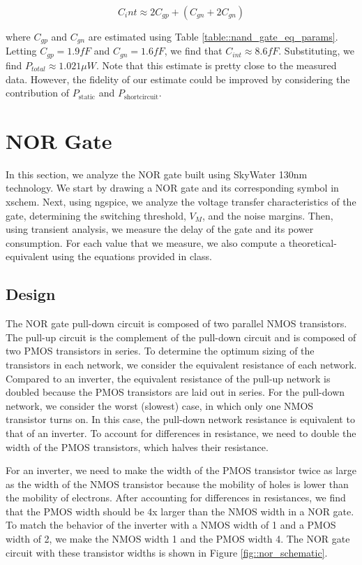 \documentclass{article}
\begin{document}
	 \begin{equation}
	 	\label{eq::nand_cint_est}
	 	C_int \approx 2C_{gp} + (C_{gn} + 2C_{gn})
	 \end{equation}
	 
	  \noindent where $C_{gp}$ and $C_{gn}$ are estimated using Table \ref{table::nand_gate_eq_params}. Letting $C_{gp} = 1.9 fF$ and $C_{gn} = 1.6 fF$, we find that $C_{int} \approx 8.6 fF$. Substituting, we find $P_{total} \approx 1.021 {\mu}W$. Note that this estimate is pretty close to the measured data. However, the fidelity of our estimate could be improved by considering the contribution of $P_{\text{static}}$ and $P_{\text{shortcircuit}}$.
	   
	\section{NOR Gate}
	
	In this section, we analyze the NOR gate built using SkyWater 130nm technology. We start by drawing a NOR gate and its corresponding symbol in xschem. Next, using ngspice, we analyze the voltage transfer characteristics of the gate, determining the switching threshold, $V_M$, and the noise margins. Then, using transient analysis, we measure the delay of the gate and its power consumption. For each value that we measure, we also compute a theoretical-equivalent using the equations provided in class.
	
	\subsection{Design}
	
	The NOR gate pull-down circuit is composed of two parallel NMOS transistors. The pull-up circuit is the complement of the pull-down circuit and is composed of two PMOS transistors in series. To determine the optimum sizing of the transistors in each network, we consider the equivalent resistance of each network. Compared to an inverter, the equivalent resistance of the pull-up network is doubled because the PMOS transistors are laid out in series. For the pull-down network, we consider the worst (slowest) case, in which only one NMOS transistor turns on. In this case, the pull-down network resistance is equivalent to that of an inverter. To account for differences in resistance, we need to double the width of the PMOS transistors, which halves their resistance. 
	
	For an inverter, we need to make the width of the PMOS transistor twice as large as the width of the NMOS transistor because the mobility of holes is lower than the mobility of electrons. After accounting for differences in resistances, we find that the PMOS width should be 4x larger than the NMOS width in a NOR gate. To match the behavior of the inverter with a NMOS width of 1 and a PMOS width of 2, we make the NMOS width 1 and the PMOS width 4. The NOR gate circuit with these transistor widths is shown in Figure \ref{fig::nor_schematic}.
	
\end{document}
